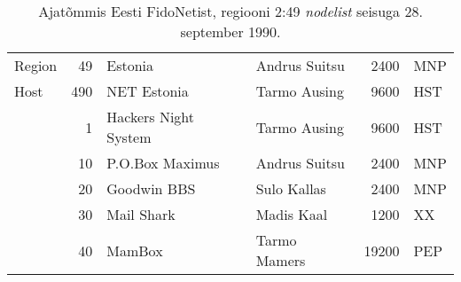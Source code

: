 \nopagebreak[4]


\begin{table}
\label{sisu:nodelist}
\centering
\begin{tabular}{lrllrl}
Region & 49  & Estonia              & Andrus Suitsu\index[ppl]{Suitsu, Andrus} & 2400  & MNP  \\
Host   & 490 & NET Estonia           & Tarmo Ausing\index[ppl]{Ausing, Tarmo}  & 9600  & HST  \\
       & 1   & Hackers Night System  & Tarmo Ausing  & 9600  & HST  \\
       & 10  & P.O.Box Maximus       & Andrus Suitsu & 2400  & MNP  \\
       & 20  & Goodwin BBS           & Sulo Kallas\index[ppl]{Kallas, Sulo}   & 2400  & MNP  \\
       & 30  & Mail Shark            & Madis Kaal\index[ppl]{Kaal, Madis}    & 1200  & XX   \\
       & 40  & MamBox                & Tarmo Mamers\index[ppl]{Mamers, Tarmo}  & 19200 & PEP 
\end{tabular}
\caption{Ajatõmmis Eesti FidoNetist, regiooni 2:49 \emph{nodelist} seisuga 28. september 1990.}
\end{table}


